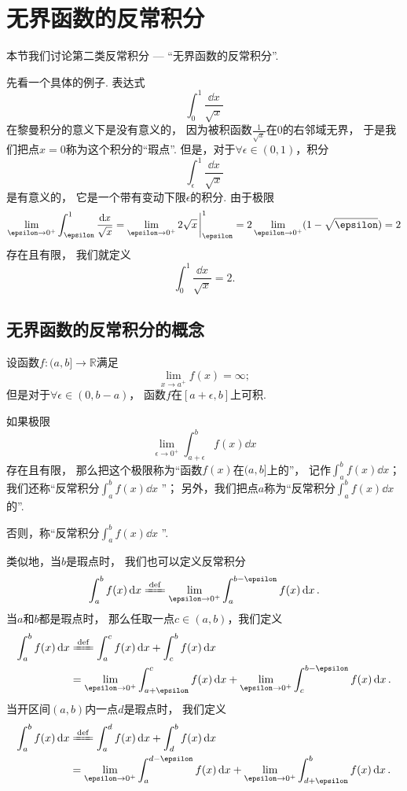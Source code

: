 \section{无界函数的反常积分}
本节我们讨论第二类反常积分 --- “无界函数的反常积分”.

先看一个具体的例子.
表达式\[
	\int_0^1 \frac{\dd{x}}{\sqrt{x}}
\]在黎曼积分的意义下是没有意义的，
因为被积函数\(\frac{1}{\sqrt{x}}\)在\(0\)的右邻域无界，
于是我们把点\(x=0\)称为这个积分的“瑕点”.
但是，对于\(\forall\epsilon\in(0,1)\)，积分\[
	\int_\epsilon^1 \frac{\dd{x}}{\sqrt{x}}
\]是有意义的，
它是一个带有变动下限\(\epsilon\)的积分.
由于极限\[
	\lim_{\epsilon\to0^+} \int_\epsilon^1 \frac{\dd{x}}{\sqrt{x}}
	= \lim_{\epsilon\to0^+} 2\sqrt{x}\eval_\epsilon^1
	= 2 \lim_{\epsilon\to0^+} (1-\sqrt\epsilon)
	= 2
\]存在且有限，
我们就定义\[
	\int_0^1 \frac{\dd{x}}{\sqrt{x}}=2.
\]

\subsection{无界函数的反常积分的概念}
\begin{definition}\label{definition:定积分.无界函数的反常积分的定义1}
设函数\(f\colon(a,b]\to\mathbb{R}\)满足\[
	\lim_{x \to a^+} f(x) = \infty;
\]
但是对于\(\forall\epsilon\in(0,b-a)\)，
函数\(f\)在\([a+\epsilon,b]\)上可积.

如果极限\[
	\lim_{\epsilon\to0^+} \int_{a+\epsilon}^b f(x) \dd{x}
\]存在且有限，
那么把这个极限称为“函数\(f(x)\)在\((a,b]\)上的”，
记作\(\int_a^b f(x) \dd{x}\)；
我们还称“反常积分\(\int_a^b f(x) \dd{x}\) ”；
另外，我们把点\(a\)称为“反常积分\(\int_a^b f(x) \dd{x}\)的”.

否则，称“反常积分\(\int_a^b f(x) \dd{x}\) ”.
\end{definition}

类似地，当\(b\)是瑕点时，
我们也可以定义反常积分\[
	\int_a^b f(x) \dd{x}
	\defeq
	\lim_{\epsilon\to0^+} \int_a^{b-\epsilon} f(x) \dd{x}.
\]
当\(a\)和\(b\)都是瑕点时，
那么任取一点\(c\in(a,b)\)，我们定义\begin{align*}
	\int_a^b f(x) \dd{x}
	&\defeq
	\int_a^c f(x) \dd{x}
	+ \int_c^b f(x) \dd{x} \\
	&= \lim_{\epsilon\to0^+} \int_{a+\epsilon}^c f(x) \dd{x}
	+ \lim_{\epsilon\to0^+} \int_c^{b-\epsilon} f(x) \dd{x}.
\end{align*}
当开区间\((a,b)\)内一点\(d\)是瑕点时，
我们定义\begin{align*}
	\int_a^b f(x) \dd{x}
	&\defeq \int_a^d f(x) \dd{x}
		+ \int_d^b f(x) \dd{x} \\
	&= \lim_{\epsilon\to0^+} \int_a^{d-\epsilon} f(x) \dd{x}
		+ \lim_{\epsilon\to0^+} \int_{d+\epsilon}^b f(x) \dd{x}.
\end{align*}

